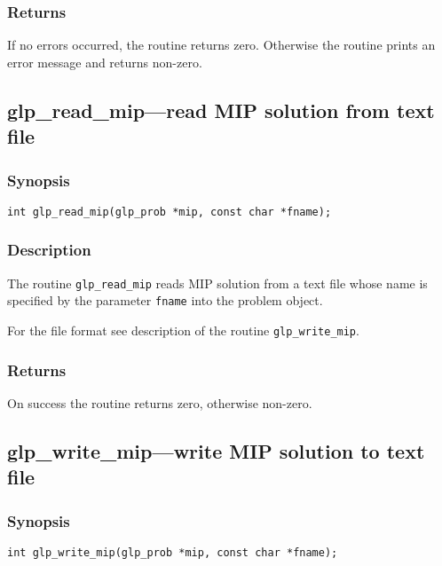 \subsubsection*{Returns}

If no errors occurred, the routine returns zero. Otherwise the routine
prints an error message and returns non-zero.

\newpage

\subsection{glp\_read\_mip---read MIP solution from text file}

\subsubsection*{Synopsis}

\begin{verbatim}
int glp_read_mip(glp_prob *mip, const char *fname);
\end{verbatim}

\subsubsection*{Description}

The routine \verb|glp_read_mip| reads MIP solution from a text file
whose name is specified by the parameter \verb|fname| into the problem
object.

For the file format see description of the routine \verb|glp_write_mip|.

\subsubsection*{Returns}

On success the routine returns zero, otherwise non-zero.

\subsection{glp\_write\_mip---write MIP solution to text file}

\subsubsection*{Synopsis}

\begin{verbatim}
int glp_write_mip(glp_prob *mip, const char *fname);
\end{verbatim}

